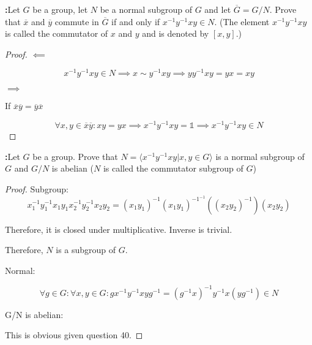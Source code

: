 \documentclass[11pt]{article}
\newcommand{\one}{\mathds{1}}
\newenvironment{exercise}[1]
	{\noindent \textbf{#1:}}
	{\par \vspace{0.5\baselineskip}}
\begin{document}
\begin{exercise}{40}
	\textsf{Let \(G\) be a group, let \(N\) be a normal subgroup of \(G\) and let \(\overline{G} = G/N\). Prove that \(\overline{x}\) and \(\overline{y}\) commute in \(\overline{G}\) if and only if \(x^{-1}y^{-1}xy \in N\). (The element \(x^{-1}y^{-1}xy\) is called the commutator of \(x\) and \(y\) and is denoted by \([x, y]\).)}
\end{exercise}{}

\begin{proof}
	$\impliedby$

	\[
		x^{-1}y^{-1}xy \in N \implies x \sim y^{-1}xy \implies yy^{-1}xy = yx = xy
	\]

	$\implies$

	If $\overline{x}\overline{y}=\overline{y}\overline{x}$

	\[
		\forall x,y \in \overline{x}\overline{y} :xy=yx \implies x^{-1}y^{-1}xy=\one \implies x^{-1}y^{-1}xy \in N
	\]
\end{proof}

\begin{exercise}{41}
	\textsf{Let \(G\) be a group. Prove that \(N = \langle x^{-1}y^{-1} xy | x, y \in G \rangle\) is a normal subgroup of \(G\) and \(G / N\) is abelian (\(N\) is called the commutator subgroup of \(G\))}
\end{exercise}{}

\begin{proof}
	Subgroup:
	\[
		x_1^{-1}y_1^{-1}x_1y_1x_2^{-1}y_2^{-1}x_2y_2 = (x_1y_1)^{-1}(x_1y_1)^{-1^{-1}}((x_2y_2)^{-1})(x_2y_2)
	\]

	Therefore, it is closed under multiplicative. Inverse is trivial.

	Therefore, $N$ is a subgroup of $G$.

	Normal:

	\[
		\forall g \in G: \forall x,y \in G: gx^{-1}y^{-1}xyg^{-1}=(g^{-1}x)^{-1}y^{-1}x(yg^{-1}) \in N
	\]

	G/N is abelian:

	This is obvious given question 40.
\end{proof}
\end{document}
